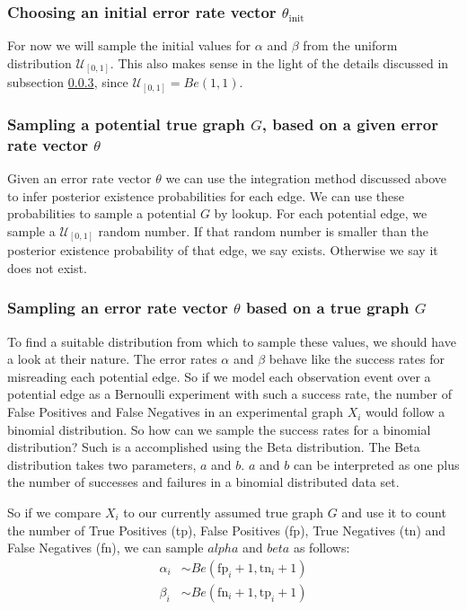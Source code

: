\documentclass{scrartcl}
\begin{document}
\subsubsection{Choosing an initial error rate vector $\theta_{\text{init}}$}

For now we will sample the initial values for $\alpha$ and $\beta$ from the uniform distribution $\mathcal{U}_{[0,1]}$. This also makes sense in the light of the details discussed in subsection \ref{sampling_theta}, since $\mathcal{U}_{[0,1]} = Be(1,1)$.



\subsubsection{Sampling a potential true graph $G$, based on a given error rate vector $\theta$}

Given an error rate vector $\theta$ we can use the integration method discussed above to infer posterior existence probabilities for each edge. We can use these probabilities to sample a potential $G$ by lookup. For each potential edge, we sample a $\mathcal{U}_{[0,1]}$ random number. If that random number is smaller than the posterior existence probability of that edge, we say exists. Otherwise we say it does not exist.



\subsubsection{Sampling an error rate vector $\theta$ based on a true graph $G$}
\label{sampling_theta}

To find a suitable distribution from which to sample these values, we should have a look at their nature. The error rates $\alpha$ and $\beta$ behave like the success rates for misreading each potential edge. So if we model each observation event over a potential edge as a Bernoulli experiment with such a success rate, the number of False Positives and False Negatives in an experimental graph $X_i$ would follow a binomial distribution. So how can we sample the success rates for a binomial distribution? Such is a accomplished using the Beta distribution. The Beta distribution takes two parameters, $a$ and $b$. $a$ and $b$ can be interpreted as one plus the number of successes and failures in a binomial distributed data set.

So if we compare $X_i$ to our currently assumed true graph $G$ and use it to count the number of True Positives (tp), False Positives (fp), True Negatives (tn) and False Negatives (fn), we can sample $alpha$ and $beta$ as follows:
\begin{align*}
  \alpha_i &\sim Be(\text{fp}_i+1, \text{tn}_i+1)\\
  \beta_i &\sim Be(\text{fn}_i+1, \text{tp}_i+1)
\end{align*}
\end{document}
